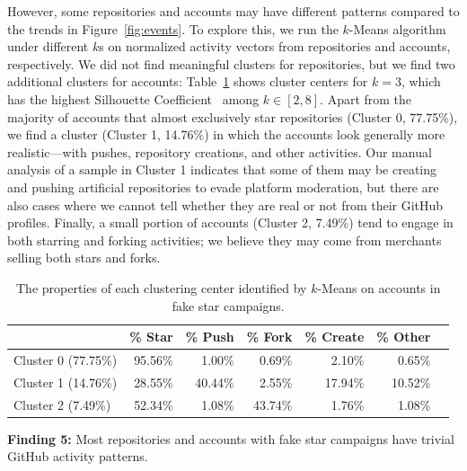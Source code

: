 However, some repositories and accounts may have different patterns compared to the trends in Figure~\ref{fig:events}. 
To explore this, we run the $k$-Means algorithm~\cite{DBLP:conf/soda/ArthurV07} under different $k$s on normalized activity vectors from repositories and accounts, respectively.
We did not find meaningful clusters for repositories, but we find two additional clusters for accounts: Table~\ref{tab:cluster-center} shows cluster centers for $k = 3$, which has the highest Silhouette Coefficient~\cite{rousseeuw1987silhouettes} among $k \in [2,8]$.
Apart from the majority of accounts that almost exclusively star repositories (Cluster 0, 77.75\%), we find a cluster (Cluster 1, 14.76\%) in which the accounts look generally more realistic---with pushes, repository creations, and other activities.
Our manual analysis of a sample in Cluster 1 indicates that some of them may be creating and pushing artificial repositories to evade platform moderation, but there are also cases where we cannot tell whether they are real or not from their GitHub profiles.
Finally, a small portion of accounts (Cluster 2, 7.49\%) tend to engage in both starring and forking activities; we believe they may come from merchants selling both stars and forks.

\begin{table}
    \centering
    \small
    \caption{The properties of each clustering center identified by $k$-Means on accounts in fake star campaigns.}
    \begin{tabular}{lrrrrrr}
    \toprule
        & \% Star & \% Push & \% Fork & \% Create & \% Other \\
    \midrule
        Cluster 0 (77.75\%) & 95.56\% & 1.00\% &  0.69\% & 2.10\% & 0.65\% \\
        Cluster 1 (14.76\%) & 28.55\% & 40.44\% & 2.55\% & 17.94\% & 10.52\% \\
        Cluster 2 (7.49\%) & 52.34\% & 1.08\% & 43.74\% & 1.76\% & 1.08\%\\
    \bottomrule
    \end{tabular}
    \label{tab:cluster-center}
\end{table}

\begin{summary-rq}
\textbf{Finding 5:} 
Most repositories and accounts with fake star campaigns have trivial GitHub activity patterns.
\end{summary-rq}


